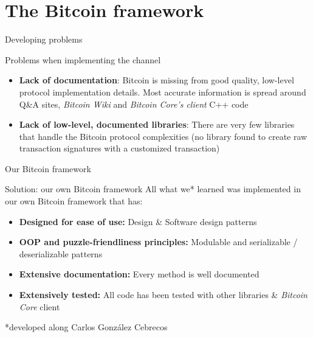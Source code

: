 \documentclass{beamer}
\begin{document}
\section{The Bitcoin framework}
\begin{frame}{Developing problems}
 \begin{alertblock}{Problems when implementing the channel}
  \begin{itemize}
   \item \textbf{Lack of documentation}: Bitcoin is missing from good quality, low-level protocol implementation details. Most accurate information is spread around Q\&A sites, \textit{Bitcoin Wiki} and \textit{Bitcoin Core's client} C++ code
   \item \textbf{Lack of low-level, documented libraries}: There are very few libraries that handle the Bitcoin protocol complexities (no library found to create raw transaction signatures with a customized transaction)
  \end{itemize}
 \end{alertblock}
\end{frame}
\begin{frame}{Our Bitcoin framework}
 \begin{exampleblock}{Solution: our own Bitcoin framework}
  All what we* learned was implemented in our own Bitcoin framework that has:
  \begin{itemize}
   \item \textbf{Designed for ease of use:} Design \& Software design patterns
   \item \textbf{OOP and puzzle-friendliness principles:} Modulable and serializable / deserializable patterns
   \item \textbf{Extensive documentation:} Every method is well documented
   \item \textbf{Extensively tested:} All code has been tested with other libraries \& \textit{Bitcoin Core} client
  \end{itemize}
 \end{exampleblock}
 \begin{center}
  *developed along Carlos González Cebrecos
  \end{center}
\end{frame}
\end{document}
